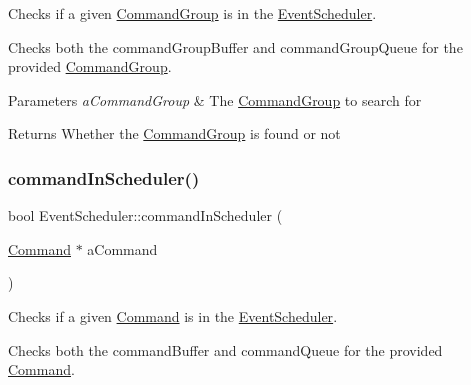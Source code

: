 Checks if a given \mbox{\hyperlink{classlib_iterative_robot_1_1_command_group}{Command\+Group}} is in the \mbox{\hyperlink{classlib_iterative_robot_1_1_event_scheduler}{Event\+Scheduler}}. 

Checks both the command\+Group\+Buffer and command\+Group\+Queue for the provided \mbox{\hyperlink{classlib_iterative_robot_1_1_command_group}{Command\+Group}}.


\begin{DoxyParams}{Parameters}
{\em a\+Command\+Group} & The \mbox{\hyperlink{classlib_iterative_robot_1_1_command_group}{Command\+Group}} to search for \\
\hline
\end{DoxyParams}
\begin{DoxyReturn}{Returns}
Whether the \mbox{\hyperlink{classlib_iterative_robot_1_1_command_group}{Command\+Group}} is found or not 
\end{DoxyReturn}
\mbox{\label{classlib_iterative_robot_1_1_event_scheduler_acc46d20d5b6e1b6d308bf64dd12ea791}} 
\subsubsection{\texorpdfstring{commandInScheduler()}{commandInScheduler()}}
{\footnotesize\ttfamily bool Event\+Scheduler\+::command\+In\+Scheduler (\begin{DoxyParamCaption}\item[{\mbox{\hyperlink{classlib_iterative_robot_1_1_command}{Command}} $\ast$}]{a\+Command }\end{DoxyParamCaption})\hspace{0.3cm}{\ttfamily [private]}}



Checks if a given \mbox{\hyperlink{classlib_iterative_robot_1_1_command}{Command}} is in the \mbox{\hyperlink{classlib_iterative_robot_1_1_event_scheduler}{Event\+Scheduler}}. 

Checks both the command\+Buffer and command\+Queue for the provided \mbox{\hyperlink{classlib_iterative_robot_1_1_command}{Command}}.


